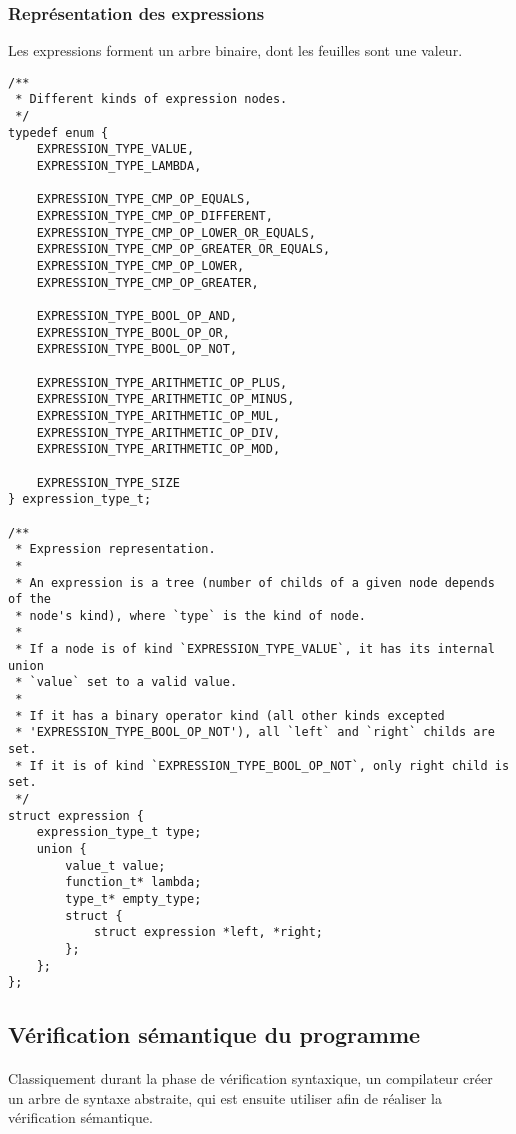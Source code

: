 \subsubsection{Représentation des expressions}

Les expressions forment un arbre binaire, dont les feuilles sont une valeur.

\begin{verbatim}
/**
 * Different kinds of expression nodes.
 */
typedef enum {
    EXPRESSION_TYPE_VALUE,
    EXPRESSION_TYPE_LAMBDA,

    EXPRESSION_TYPE_CMP_OP_EQUALS,
    EXPRESSION_TYPE_CMP_OP_DIFFERENT,
    EXPRESSION_TYPE_CMP_OP_LOWER_OR_EQUALS,
    EXPRESSION_TYPE_CMP_OP_GREATER_OR_EQUALS,
    EXPRESSION_TYPE_CMP_OP_LOWER,
    EXPRESSION_TYPE_CMP_OP_GREATER,

    EXPRESSION_TYPE_BOOL_OP_AND,
    EXPRESSION_TYPE_BOOL_OP_OR,
    EXPRESSION_TYPE_BOOL_OP_NOT,

    EXPRESSION_TYPE_ARITHMETIC_OP_PLUS,
    EXPRESSION_TYPE_ARITHMETIC_OP_MINUS,
    EXPRESSION_TYPE_ARITHMETIC_OP_MUL,
    EXPRESSION_TYPE_ARITHMETIC_OP_DIV,
    EXPRESSION_TYPE_ARITHMETIC_OP_MOD,

    EXPRESSION_TYPE_SIZE
} expression_type_t;

/**
 * Expression representation.
 *
 * An expression is a tree (number of childs of a given node depends of the
 * node's kind), where `type` is the kind of node.
 *
 * If a node is of kind `EXPRESSION_TYPE_VALUE`, it has its internal union
 * `value` set to a valid value.
 *
 * If it has a binary operator kind (all other kinds excepted
 * 'EXPRESSION_TYPE_BOOL_OP_NOT'), all `left` and `right` childs are set.
 * If it is of kind `EXPRESSION_TYPE_BOOL_OP_NOT`, only right child is set.
 */
struct expression {
    expression_type_t type;
    union {
        value_t value;
        function_t* lambda;
        type_t* empty_type;
        struct {
            struct expression *left, *right;
        };
    };
};
\end{verbatim}

\subsection{Vérification sémantique du programme}

\paragraph{}Classiquement durant la phase de vérification syntaxique, un 
compilateur créer un arbre de syntaxe abstraite, qui est ensuite utiliser afin 
de réaliser la vérification sémantique.

